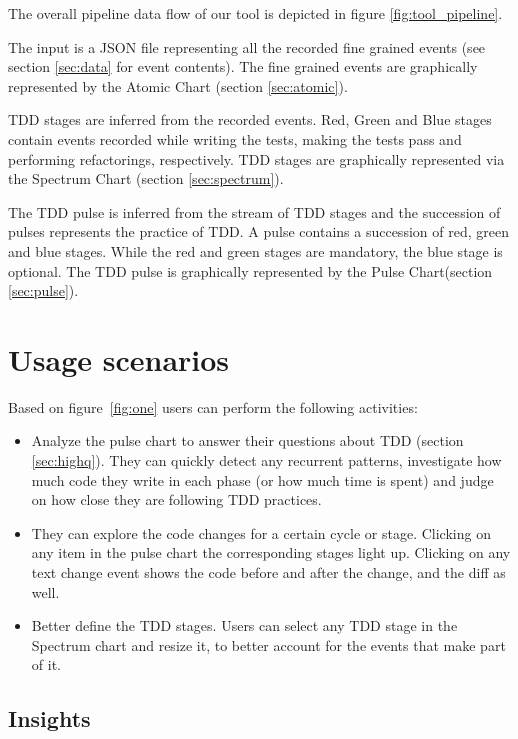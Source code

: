 \documentclass[journal]{vgtc}                %
\begin{document}
The overall pipeline data flow of our tool is depicted in figure \ref{fig:tool_pipeline}.

The input is a JSON file representing all the recorded fine grained events (see section \ref{sec:data} for event contents).
The fine grained events are graphically represented by the Atomic Chart (section \ref{sec:atomic}).

TDD stages are inferred from the recorded events.
Red, Green and Blue stages contain events recorded while writing the tests, making the tests pass and performing refactorings, respectively.
TDD stages are graphically represented via the Spectrum Chart (section \ref{sec:spectrum}).

The TDD pulse is inferred from the stream of TDD stages and the succession of pulses represents the practice of TDD.
A pulse contains a succession of red, green and blue stages.
While the red and green stages are mandatory, the blue stage is optional.
The TDD pulse is graphically represented by the Pulse Chart(section \ref{sec:pulse}).

\section{Usage scenarios}

Based on figure~\ref{fig:one} users can perform the following activities:
\begin{itemize}
	\item Analyze the pulse chart to answer their questions about TDD (section \ref{sec:highq}). 
	They can quickly detect any recurrent patterns, investigate how much code  they write in each phase (or how much time is spent) and judge on how close they are following TDD practices.
	
	\item They can explore the code changes for a certain cycle or stage. 
	Clicking on any item in the pulse chart the corresponding stages light up.
	Clicking on any text change event shows the code before and after the change, and the diff as well.
	
	\item Better define the TDD stages.
	Users can select any TDD stage in the Spectrum chart and resize it, to better account for the events that make part of it.
\end{itemize}

\subsection{Insights}
\end{document}
